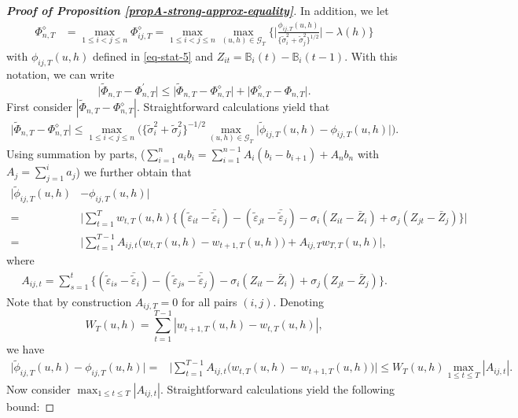 \documentclass[a4paper,12pt]{article}
\newcommand{\gaussianstat}{\Phi^\prime}
\begin{document}
\begin{proof}[\textnormal{\textbf{Proof of Proposition \ref{propA-strong-approx-equality}}}]
In addition, we let
\begin{align*}
\Phi_{n, T}^{\diamond} & =\max_{1\leq i < j \leq n} \Phi_{ij, T}^{\diamond} = \max_{1\leq i< j \leq n}\max_{(u,h) \in \mathcal{G}_T} \Big\{ \Big|\frac{\phi_{ij, T}(u,h)}{\{\widetilde{\sigma}_i^2 + \widetilde{\sigma}_j^2 \}^{1/2}}\Big| - \lambda(h) \Big\} 
\end{align*}
with $\phi_{ij, T}(u,h)$ defined in \eqref{eq-stat-5} and $Z_{it} = \mathbb{B}_i(t) - \mathbb{B}_i(t-1)$. With this notation, we can write 
\begin{equation}\label{eq-strongapprox-bound1}
\big| \widetilde{\Phi}_{n, T} - \gaussianstat_{n, T} \big| \le \big| \widetilde{\Phi}_{n, T} - \Phi_{n, T}^{\diamond} \big| + \big| \Phi_{n, T}^{\diamond} - \Phi_{n, T} \big|. 
\end{equation}
First consider $|\widetilde{\Phi}_{n, T} - \Phi_{n, T}^{\diamond}|$. Straightforward calculations yield that 
\begin{align}\label{eq-strongapprox-bound2}
\big| \widetilde{\Phi}_{n, T} - \Phi_{n, T}^{\diamond} \big| \le  \max_{1\le i < j \le n} \Big(\{\widetilde{\sigma}_i^2 + \widetilde{\sigma}_j^2 \}^{-1/2} \max_{(u,h) \in \mathcal{G}_T} \big| \widetilde{\phi}_{ij, T}(u,h) - \phi_{ij, T}(u,h) \big|\Big).
\end{align}
Using summation by parts,
($\sum_{i=1}^n a_i b_i = \sum_{i=1}^{n-1} A_i (b_i - b_{i+1}) + A_n b_n$ with $A_j = \sum_{j=1}^i a_j$) 
we further obtain that 
\begin{align*}
\big| \widetilde{\phi}_{ij, T}(u,h) &- \phi_{ij, T}(u,h) \big|  \\
=&\bigg|\sum_{t=1}^T w_{t,T}(u,h) \big\{ (\widetilde{\varepsilon}_{it} - \bar{\widetilde{\varepsilon}}_i) - (\widetilde{\varepsilon}_{jt} - \bar{\widetilde{\varepsilon}}_j) -{\sigma}_i (Z_{it} - \bar{Z}_i) + {\sigma}_j (Z_{jt} - \bar{Z}_j) \big\}\bigg|  \\
=&\Big|\sum_{t=1}^{T-1} A_{ij, t} \big(w_{t,T}(u,h) -w_{t+1,T}(u,h)\big) + A_{ij, T} w_{T,T}(u,h)\Big|,
\end{align*}
where 
\begin{align*}
A_{ij, t} = \sum_{s=1}^t \big\{ (\widetilde{\varepsilon}_{is} - \bar{\widetilde{\varepsilon}}_i)  - (\widetilde{\varepsilon}_{js} - \bar{\widetilde{\varepsilon}}_j) -{\sigma}_i (Z_{it} - \bar{Z}_i) + {\sigma}_j (Z_{jt} - \bar{Z}_j) \big\}.
\end{align*}
Note that by construction $A_{ij, T} = 0$ for all pairs $(i, j)$. Denoting 
\[ W_T(u,h) = \sum\limits_{t=1}^{T-1} |w_{t+1,T}(u,h) - w_{t,T}(u,h)|,\]
we have 
\begin{align}\label{eq-strongapprox-bound3}
\big| \widetilde{\phi}_{ij, T}(u,h) - \phi_{ij, T}(u,h) \big| =& \Big|\sum_{t=1}^{T-1} A_{ij, t} \big(w_{t,T}(u,h) -w_{t+1,T}(u,h)\big)\Big|\le W_T(u, h)\max_{1 \le t \le T} |A_{ij, t}|.
\end{align}
Now consider $\max_{1 \le t \le T} |A_{ij, t}|$. Straightforward calculations yield the following bound:


\end{proof}
\end{document}
